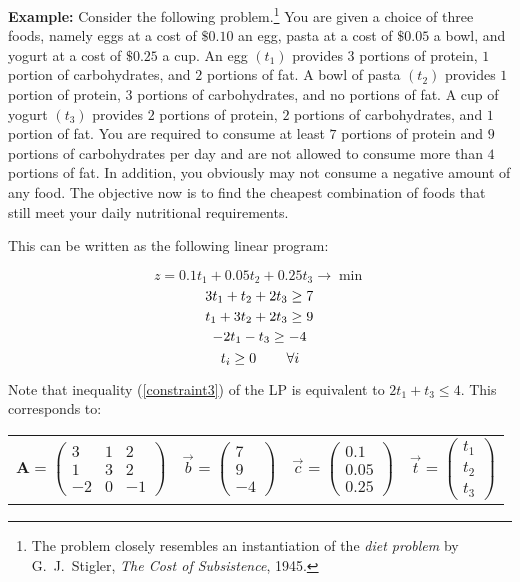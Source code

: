 \textbf{Example: }
Consider the following problem.\footnote{The problem closely resembles an
instantiation of the {\em diet problem} by G.~J.~Stigler, {\em The Cost of
Subsistence}, 1945.} You are given a choice of three foods, namely eggs at a
cost of $\$0.10$ an egg, pasta at a cost of $\$0.05$ a bowl, and yogurt at a cost
of $\$0.25$ a cup.  An egg $(t_1)$ provides $3$ portions of protein, $1$ portion of
carbohydrates, and $2$ portions of fat.  A bowl of pasta $(t_2)$ provides $1$ portion of
protein, $3$ portions of carbohydrates, and no portions of fat.  A cup of yogurt $(t_3)$
provides $2$ portions of protein, $2$ portions of carbohydrates, and $1$ portion of
fat.  You are required to consume at least $7$ portions of protein and $9$
portions of carbohydrates per day and are not allowed to consume more than $4$
portions of fat.  In addition, you obviously may not consume a negative amount
of any food.  The objective now is to find the cheapest combination of foods
that still meet your daily nutritional requirements. 

This can be written as the following linear program:

\begin{equation}
z = 0.1t_1 + 0.05t_2 + 0.25t_3 \to \min
\end{equation}
\begin{equation}
3t_1 + t_2 + 2t_3 \geq 7 \\
\end{equation}
\begin{equation}
t_1 + 3t_2 + 2t_3 \geq 9 \\
\end{equation}
\begin{equation}
-2t_1 - t_3 \geq -4 \\
\label{constraint3}
\end{equation}
\begin{equation}
t_i \geq 0 \hspace{0.3in} \forall i
\end{equation}

Note that inequality (\ref{constraint3}) of the LP is equivalent to $2t_1 +
t_3 \leq 4$. This corresponds to:

\begin{tabular}{cccc}
${\mathbf A} = \left ( \begin{array}{ccc}3 & 1 & 2\\1 & 3 & 2\\-2 & 0 & -1 \end{array} \right ) $
&
$\vec{b} = \left ( \begin{array}{c}7\\9\\-4\end{array} \right ) $
&
$\vec{c} = \left ( \begin{array}{c}0.1\\0.05\\0.25\end{array} \right ) $
&
$\vec{t} = \left ( \begin{array}{c}t_1\\t_2\\t_3\end{array} \right ) $
\end{tabular}

